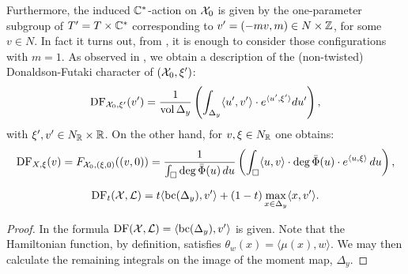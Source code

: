 Furthermore, the induced \(\mathbb{C}^*\)-action on \({\mathcal{X}}_0\) is given by the one-parameter subgroup of 
 \(T' = T \times \mathbb{C}^*\) corresponding to \(v'=(-mv,m) \in N \times \mathbb{Z}\), for some \(v \in N\). In fact it turns out, from \cite{ilten2015}, it is enough to consider those configurations with \(m=1\). As observed in \cite{ilten2015}, we obtain a description of the (non-twisted) Donaldson-Futaki character of $({\mathcal{X}}_0,\xi')$:
\begin{equation}
\mathop{\rm DF}\nolimits_{{\mathcal{X}}_0, \xi'}(v') = \frac{1}{\mathop{\rm vol}\nolimits \Delta_y}\left(\int_{\Delta_y} \langle u', v' \rangle \cdot e^{\langle u', \xi'\rangle} du'\right),\label{eq:futaki-character}
\end{equation}
with $\xi',v' \in N_{\mathbb{R}} \times \mathbb{R}$. On the other hand, for $v,\xi \in N_{\mathbb{R}}$ one obtains:
\begin{equation}
\mathop{\rm DF}\nolimits_{X, \xi}(v) = F_{{\mathcal{X}}_0, (\xi,0)}((v,0))
= \frac{1}{\int_\Box \deg \bar \Phi(u) \,du }\left(\int_{\Box} \langle u, v \rangle \cdot \deg \bar \Phi(u) \cdot e^{\langle u, \xi \rangle}\, du\right)
, \label{eq:futaki-general-fibre}
\end{equation}
\begin{lemma}
\[
\mathop{\rm DF}\nolimits_t( {\mathcal{X}}, \mathcal{L} )  = t \langle \mathop{\rm bc}\nolimits(\Delta_y), v' \rangle + (1-t) \max_{x \in \Delta_y} \langle x, v' \rangle.
\]
\end{lemma}
\begin{proof}
In \cite{ilten2015} the formula \(\mathop{\rm DF}\nolimits({\mathcal{X}},\mathcal{L}) = \langle \mathop{\rm bc}\nolimits(\Delta_y),v'\rangle\) is given. Note that the Hamiltonian function, by definition, satisfies \(\theta_w(x) = \langle \mu(x),w \rangle\). We may then calculate the remaining integrals on the image of the moment map, \(\Delta_y\).
\end{proof}